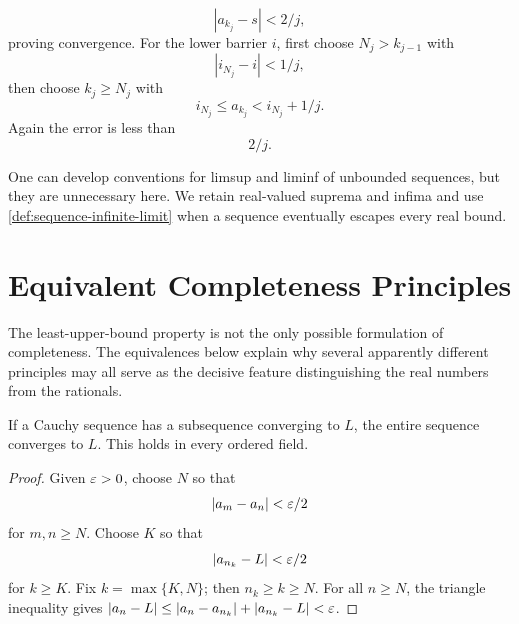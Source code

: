 \[
|a_{k_j}-s|<2/j,
\]
 proving convergence. For the lower barrier $i$, first
choose $N_j>k_{j-1}$ with
\[
|i_{N_j}-i|<1/j,
\]
 then choose $k_j\geq N_j$
with
\[
i_{N_j}\leq a_{k_j}<i_{N_j}+1/j.
\]
 Again the error is less than
\[
2/j.
\]

One can develop conventions for limsup and liminf of unbounded sequences,
but they are unnecessary here.  We retain real-valued suprema and infima
and use \cref{def:sequence-infinite-limit} when a sequence eventually
escapes every real bound.

\section{Equivalent Completeness Principles}

The least-upper-bound property is not the only possible formulation of
completeness.  The equivalences below explain why several apparently
different principles may all serve as the decisive feature distinguishing
the real numbers from the rationals.

\begin{lemma}
\label{lem:cauchy-convergent-subsequence}
If a Cauchy sequence has a subsequence converging to $L$, the entire
sequence converges to $L$. This holds in every ordered field.
\end{lemma}
\begin{proof}
Given $\varepsilon>0$, choose $N$ so that
\[
|a_m-a_n|<\varepsilon/2
\]
 for $m,n\geq N$.
Choose $K$ so that
\[
|a_{n_k}-L|<\varepsilon/2
\]
 for $k\geq K$.
Fix $k=\max\{K,N\}$; then $n_k\geq k\geq N$.
For all $n\geq N$, the triangle inequality gives
$|a_n-L|\leq|a_n-a_{n_k}|+|a_{n_k}-L|<\varepsilon$.
\end{proof}

